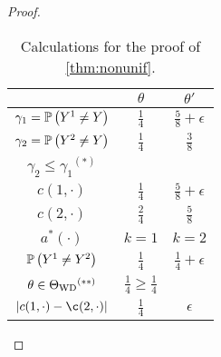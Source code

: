 \begin{proof}
\def\arraystretch{1.5}
\begin{table}[]
	\centering
	\begin{tabular}{|c|c|c|}
		\hline
		& $\theta$                & $\theta'$ \\ \hline
		$\gamma_1 = \mathbb{P}\left(Y^1\ne Y\right)$ & $\frac{1}{4}$           & $\frac{5}{8}+\epsilon$ \\ \hline
		$\gamma_2 = \mathbb{P}\left(Y^2\ne Y\right)$ & $\frac{1}{4}$           & $\frac{3}{8}$ \\ \hline
		$\gamma_2 \le \gamma_1 \mbox{}^{(*)}$        & \checkmark           & \checkmark \\ \hline
		$c(1,\cdot)$                                 & $\frac{1}{4}$           & $\frac{5}{8}+\epsilon$ \\ \hline
		$c(2,\cdot)$                                 & $\frac{2}{4}$           & $\frac{5}{8}$ \\ \hline
		$a^*(\cdot)$                                 & $k=1$                   & $k=2$ \\ \hline
		$\mathbb{P}\left(Y^1\ne Y^2\right)$                   & $\frac{1}{4}$         & $\frac{1}{4}+\epsilon$ \\ \hline
		$\theta \in \Theta_{\mathrm{WD}}  \mbox{}^{(**)}$                        & $\frac{1}{4}\ge \frac14$ \checkmark & \checkmark \\ \hline
		$|c(1,\cdot)-\c(2,\cdot)|$              & $\frac{1}{4}$         & $\epsilon$ \\ \hline
	\end{tabular}
	\vspace*{0.1in}
	\caption{Calculations for the proof of \cref{thm:nonunif}.}
	\label{tab:nonunif2}
\end{table}


\end{proof}

